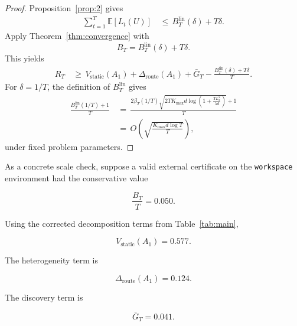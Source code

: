 \documentclass{article} %
\begin{document}
\begin{proof}
Proposition~\ref{prop:2} gives
\begin{align}
\label{eq:app-linucb-plugin-proof-tax}
\sum_{t=1}^{T}\mathbb{E}[L_t(U)]
&\,\le\,
B_T^{\mathrm{lin}}(\delta)+T\delta.
\end{align}
Apply Theorem~\ref{thm:convergence} with
\begin{equation}
\label{eq:app-linucb-plugin-proof-b}
B_T
=
B_T^{\mathrm{lin}}(\delta)+T\delta.
\end{equation}
This yields
\begin{align}
\label{eq:app-linucb-plugin-proof-bound}
R_T
&\,\ge\,
V_{\mathrm{static}}(A_1)
+
\Delta_{\mathrm{route}}(A_1)
+
\bar G_T
-
\frac{B_T^{\mathrm{lin}}(\delta)+T\delta}{T}.
\end{align}
For \(\delta=1/T\), the definition of \(B_T^{\mathrm{lin}}\) gives
\begin{align}
\label{eq:app-linucb-plugin-proof-rate}
\frac{B_T^{\mathrm{lin}}(1/T)+1}{T}
&\,=\,
\frac{
2\beta_T(1/T)
\sqrt{
2T K_{\max}d
\log\!\left(1+\frac{T L_x^2}{\lambda d}\right)
}
+1
}{T}
\\
&\,=\,
O\!\left(
\sqrt{
\frac{K_{\max}d\log T}{T}
}
\right),
\end{align}
under fixed problem parameters.
\end{proof}

As a concrete scale check, suppose a valid external certificate on the \texttt{workspace} environment had the conservative value

\begin{equation}
\label{eq:app-workspace-certificate}
\frac{B_T}{T}
=
0.050.
\end{equation}

Using the corrected decomposition terms from Table~\ref{tab:main},

\begin{equation}
\label{eq:app-workspace-static}
V_{\mathrm{static}}(A_1)
=
0.577.
\end{equation}

The heterogeneity term is

\begin{equation}
\label{eq:app-workspace-het}
\Delta_{\mathrm{route}}(A_1)
=
0.124.
\end{equation}

The discovery term is

\begin{equation}
\label{eq:app-workspace-discovery}
\bar G_T
=
0.041.
\end{equation}
\end{document}
